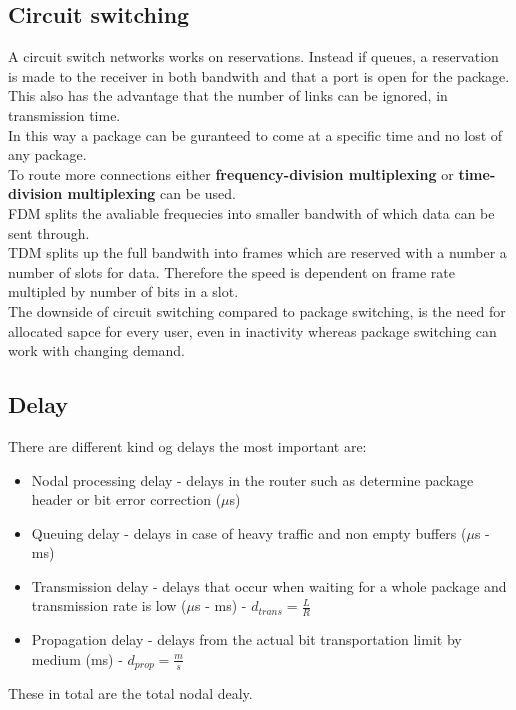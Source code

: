 \documentclass[12pt, a4paper]{article}
\begin{document}
		\subsection{Circuit switching}
			A circuit switch networks works on reservations. Instead if queues, a reservation is made to the receiver in both bandwith and that a port is open for the package.\\
			This also has the advantage that the number of links can be ignored, in transmission time.\\
			In this way a package can be guranteed to come at a specific time and no lost of any package.\\
			To route more connections either \textbf{frequency-division multiplexing} or \textbf{time-division multiplexing} can be used.\\
			FDM splits the avaliable frequecies into smaller bandwith of which data can be sent through.\\
			TDM splits up the full bandwith into frames which are reserved with a number a number of slots for data. Therefore the speed is dependent on frame rate multipled by number of bits in a slot.\\
			The downside of circuit switching compared to package switching, is the need for allocated sapce for every user, even in inactivity whereas package switching can work with changing demand.
		\subsection{Delay}
			There are different kind og delays the most important are:
			\begin{itemize}
				\item Nodal processing delay - delays in the router such as determine package header or bit error correction ($\mu$s)
				\item Queuing delay - delays in case of heavy traffic and non empty buffers ($\mu$s - ms)
				\item Transmission delay - delays that occur when waiting for a whole package and transmission rate is low  ($\mu$s - ms) - $d_{trans}=\frac{L}{R}$
				\item Propagation delay - delays from the actual bit transportation limit by medium (ms) - $d_{prop}=\frac{m}{s}$
			\end{itemize}
			These in total are the total nodal dealy.\\
			
\end{document}
